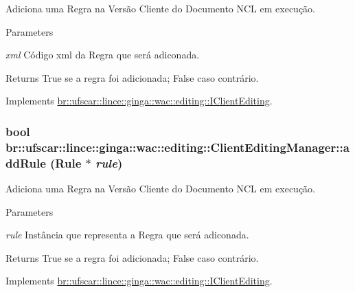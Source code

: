 Adiciona uma Regra na Versão Cliente do Documento NCL em execução. 


\begin{DoxyParams}{Parameters}
\item[{\em xml}]Código xml da Regra que será adiconada. \end{DoxyParams}
\begin{DoxyReturn}{Returns}
True se a regra foi adicionada; False caso contrário. 
\end{DoxyReturn}


Implements \hyperlink{classbr_1_1ufscar_1_1lince_1_1ginga_1_1wac_1_1editing_1_1IClientEditing_a9268c1aa4301692ad9ed3c17e97d5f45}{br::ufscar::lince::ginga::wac::editing::IClientEditing}.

\hypertarget{classbr_1_1ufscar_1_1lince_1_1ginga_1_1wac_1_1editing_1_1ClientEditingManager_a21f7109da6d0eb0b54629547513ff69e}{
\subsubsection[{addRule}]{\setlength{\rightskip}{0pt plus 5cm}bool br::ufscar::lince::ginga::wac::editing::ClientEditingManager::addRule (Rule $\ast$ {\em rule})}}
\label{classbr_1_1ufscar_1_1lince_1_1ginga_1_1wac_1_1editing_1_1ClientEditingManager_a21f7109da6d0eb0b54629547513ff69e}


Adiciona uma Regra na Versão Cliente do Documento NCL em execução. 


\begin{DoxyParams}{Parameters}
\item[{\em rule}]Instância que representa a Regra que será adiconada. \end{DoxyParams}
\begin{DoxyReturn}{Returns}
True se a regra foi adicionada; False caso contrário. 
\end{DoxyReturn}


Implements \hyperlink{classbr_1_1ufscar_1_1lince_1_1ginga_1_1wac_1_1editing_1_1IClientEditing_abc156e111b7741a7f55c28b835614178}{br::ufscar::lince::ginga::wac::editing::IClientEditing}.

